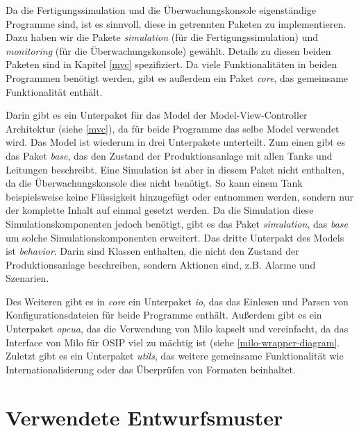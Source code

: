 \documentclass[parskip=full]{scrartcl}
\begin{document}
Da die Fertigungssimulation und die Überwachungskonsole eigenständige Programme sind, ist es sinnvoll, diese in getrennten Paketen zu
implementieren. Dazu haben wir die Pakete \emph{simulation} (für die Fertigungssimulation) und \emph{monitoring} (für die Überwachungskonsole)
gewählt. Details zu diesen beiden Paketen sind in Kapitel \ref{mvc} spezifiziert. Da viele Funktionalitäten in beiden Programmen
benötigt werden, gibt es außerdem ein Paket \emph{core}, das gemeinsame Funktionalität enthält.

Darin gibt es ein Unterpaket für das Model
der Model-View-Controller Architektur (siehe \ref{mvc}), da für beide Programme das selbe Model verwendet wird. Das Model ist wiederum in
drei Unterpakete unterteilt. Zum einen gibt es das Paket \emph{base}, das den Zustand der Produktionsanlage mit allen Tanks und Leitungen beschreibt.
Eine Simulation ist aber in diesem Paket nicht enthalten, da die Überwachungskonsole dies nicht benötigt. So kann einem Tank beispielsweise keine Flüssigkeit hinzugefügt oder entnommen werden,
sondern nur der komplette Inhalt auf einmal gesetzt werden. Da die Simulation diese Simulationskomponenten jedoch benötigt,
gibt es das Paket \emph{simulation}, das \emph{base} um solche Simulationskomponenten erweitert. Das dritte Unterpakt des Models ist \emph{behavior}.
Darin sind Klassen enthalten, die nicht den Zustand der Produktionsanlage beschreiben, sondern Aktionen sind, z.B. Alarme und Szenarien.

Des Weiteren gibt es in \emph{core} ein Unterpaket \emph{io}, das das Einlesen und Parsen von Konfigurationsdateien für beide Programme enthält. Außerdem gibt
es ein Unterpaket \emph{opcua}, das die Verwendung von Milo kapselt und vereinfacht, da das Interface von Milo für OSIP viel zu mächtig
ist (siehe \ref{milo-wrapper-diagram}. Zuletzt gibt es ein Unterpaket \emph{utils}, das weitere gemeinsame Funktionalität wie Internationalisierung oder das Überprüfen von
Formaten beinhaltet.

\pagebreak
\section{Verwendete Entwurfsmuster}
\end{document}
